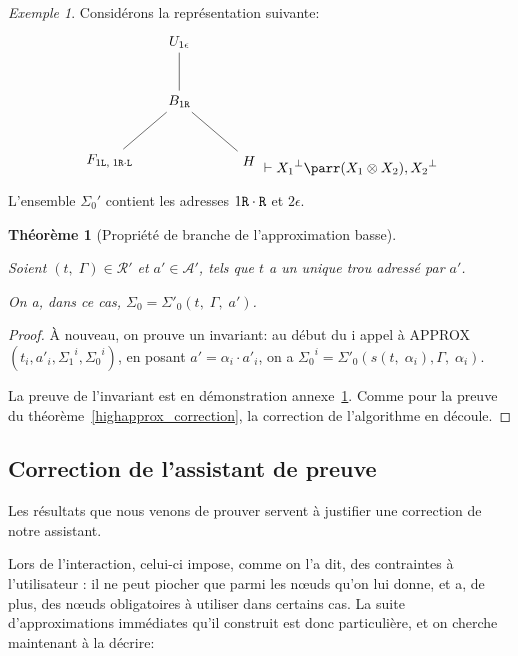 \documentclass[11pt,a4paper]{article}
\theoremstyle{plain}
\newtheorem{theorem}{Théorème}
\theoremstyle{definition}
\theoremstyle{remark}
\newtheorem{example}{Exemple}
\newcommand*{\orth}{^\perp}
\newcommand*{\tensor}{\otimes}
\newcommand*{\sequent}{\Gamma}
\newcommand*{\Left}{\textnormal{\texttt{L}}}
\newcommand*{\Right}{\textnormal{\texttt{R}}}
\newcommand*{\treeaddresses}{\ensuremath{\mathcal{A'}}}
\newcommand*{\representationspartial}{\ensuremath{\mathcal{R'}}}
\newcommand*{\lowapprox}{\ensuremath{\Sigma_0}}
\newcommand*{\lowapproxspec}{\ensuremath{\Sigma'_0}}
\newcommand*{\highapprox}{\ensuremath{\Sigma_1}}
\newcommand*{\treesimplify}{\ensuremath{s}}
\begin{document}
\begin{example}Considérons la représentation suivante:
    \begin{equation*}
        \begin{tikzpicture}%
            [level distance=1.5cm,
            level 2/.style={sibling distance=3.5cm}]
            \node {$U_{1 \epsilon}$}
            child {node {$B_{1 \Right}$}
                child {node {$F_{1 \Left, \; 1 \Right \cdot \Left}$}}
                child {node {$H$}}
            };
        \end{tikzpicture}
        \vdash {X_1}\orth \parr (X_1 \tensor X_2), {X_2}\orth
    \end{equation*}

    L'ensemble $\lowapprox'$ contient les adresses $1 \Right \cdot \Right$ et $2 \epsilon$.
\end{example}
    
\begin{theorem}[Propriété de branche de l'approximation basse]
    \label{lowapprox_correction}
    
    Soient $(t, \; \sequent) \in \representationspartial$ et $a' \in \treeaddresses$, tels que $t$ a un unique trou adressé par $a'$.
    
    On a, dans ce cas, $\lowapprox = \lowapproxspec \left( t, \; \sequent, \; a' \right)$. 
\end{theorem}

\begin{proof}
    À nouveau, on prouve un invariant: au début du i\ieme{} appel à APPROX$(t_i, a'_i, {\highapprox}^i, {\lowapprox}^i)$, en posant $a' = {\alpha}_i \cdot a'_i$, on a ${\lowapprox}^i = \lowapproxspec \left( \treesimplify( t, \; {\alpha}_i ), \sequent, \; {\alpha}_i \right)$.

    La preuve de l'invariant est en démonstration annexe~\ref{lowapprox_correction}. Comme pour la preuve du théorème~\ref{highapprox_correction}, la correction de l'algorithme en découle.
\end{proof}

\subsection{Correction de l'assistant de preuve}
\label{correction_section}

Les résultats que nous venons de prouver servent à justifier une correction de notre assistant.

Lors de l'interaction, celui-ci impose, comme on l'a dit, des contraintes à l'utilisateur : il ne peut piocher que parmi les n\oe uds qu'on lui donne, et a, de plus, des n\oe uds obligatoires à utiliser dans certains cas. La suite d'approximations immédiates qu'il construit est donc particulière, et on cherche maintenant à la décrire:
\end{document}
